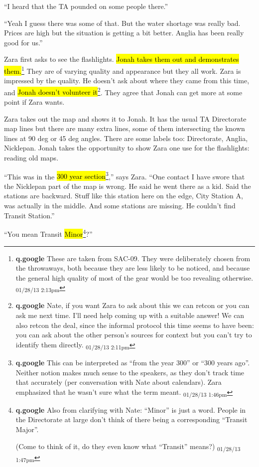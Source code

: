 ``I heard that the TA pounded on some people there.''

``Yeah I guess there was some of that.  But the water shortage was really bad.  Prices are high but the situation is getting a bit better.  Anglia has been really good for us.''



Zara first asks to see the flashlights.  \hl{Jonah takes them out and demonstrates them.}\footnote{\textbf{q.google }These are taken from SAC-09.  They were deliberately chosen from the throwaways, both because they are less likely to be noticed, and because the general high quality of most of the gear would be too revealing otherwise. \textsubscript{01/28/13 2:13pm}}  They are of varying quality and appearance but they all work.  Zara is impressed by the quality.   He doesn't ask about where they came from this time, and \hl{Jonah doesn't volunteer it}\footnote{\textbf{q.google }Nate, if you want Zara to ask about this we can retcon or you can ask me next time.  I'll need help coming up with a suitable answer!  We can also retcon the deal, since the informal protocol this time seems to have been: you can ask about the other person's sources for context but you can't try to identify them directly. \textsubscript{01/28/13 2:11pm}}.  They agree that Jonah can get more at some point if Zara wants.



Zara takes out the map and shows it to Jonah.  It has the usual TA Directorate map lines but there are many extra lines, some of them intersecting the known lines at 90 deg or 45 deg angles.  There are some labels too: Directorate, Anglia, Nicklepan.  Jonah takes the opportunity to show Zara one use for the flashlights: reading old maps.



``This was in the \hl{300 year section}\footnote{\textbf{q.google }This can be interpreted as ``from the year 300'' or ``300 years ago''.  Neither notion makes much sense to the speakers, as they don't track time that accurately (per conversation with Nate about calendars).  Zara emphasized that he wasn't sure what the term meant. \textsubscript{01/28/13 1:46pm}},'' says Zara.  ``One contact I have swore that the Nicklepan part of the map is wrong.  He said he went there as a kid.  Said the stations are backward.  Stuff like this station here on the edge, City Station A, was actually in the middle.  And some stations are missing.  He couldn't find Transit Station.''

``You mean Transit \hl{Minor}\footnote{\textbf{q.google }Also from clarifying with Nate: ``Minor'' is just a word.  People in the Directorate at large don't think of there being a corresponding ``Transit Major''.

(Come to think of it, do they even know what ``Transit'' means?) \textsubscript{01/28/13 1:47pm}}?''

